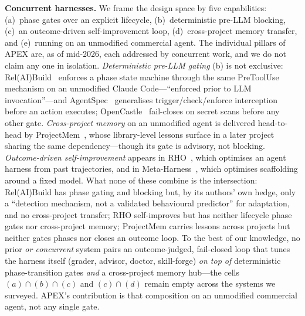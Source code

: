 \documentclass[sigconf,review,anonymous=false]{acmart}
\begin{document}
\textbf{Concurrent harnesses.} We frame the design space by five capabilities:
(a)~phase gates over an explicit lifecycle, (b)~deterministic pre-LLM blocking,
(c)~an outcome-driven self-improvement loop, (d)~cross-project memory transfer, and
(e)~running on an unmodified commercial agent. The individual pillars of APEX are, as
of mid-2026, each addressed by concurrent work, and we do not claim any one in
isolation. \emph{Deterministic pre-LLM gating} (b) is not exclusive:
Rel(AI)Build~\cite{madatha2026relaibuild} enforces a phase state machine through the
same \textsf{PreToolUse} mechanism on an unmodified Claude Code---``enforced prior to
LLM invocation''---and AgentSpec~\cite{agentspec2026} generalises trigger/check/enforce
interception before an action executes; OpenCastle~\cite{opencastle2026} fail-closes
on secret scans before any other gate. \emph{Cross-project memory} on an unmodified
agent is delivered head-to-head by ProjectMem~\cite{malo2026projectmem}, whose
library-level lessons surface in a later project sharing the same dependency---though
its gate is advisory, not blocking. \emph{Outcome-driven self-improvement} appears in
RHO~\cite{rho2026}, which optimises an agent harness from past trajectories, and in
Meta-Harness~\cite{lee2026metaharness}, which optimises scaffolding around a fixed
model. What none of these combine is the intersection: Rel(AI)Build has phase gating
and blocking but, by its authors' own hedge, only a ``detection mechanism, not a
validated behavioural predictor'' for adaptation, and no cross-project transfer; RHO
self-improves but has neither lifecycle phase gates nor cross-project memory;
ProjectMem carries lessons across projects but neither gates phases nor closes an
outcome loop. To the best of our knowledge, no prior \emph{or concurrent} system pairs
an outcome-judged, fail-closed loop that tunes the harness itself (grader, advisor,
doctor, skill-forge) \emph{on top of} deterministic phase-transition gates \emph{and}
a cross-project memory hub---the cells $(a){\cap}(b){\cap}(c)$ and $(c){\cap}(d)$
remain empty across the systems we surveyed. APEX's contribution is that composition
on an unmodified commercial agent, not any single gate.

\end{document}
